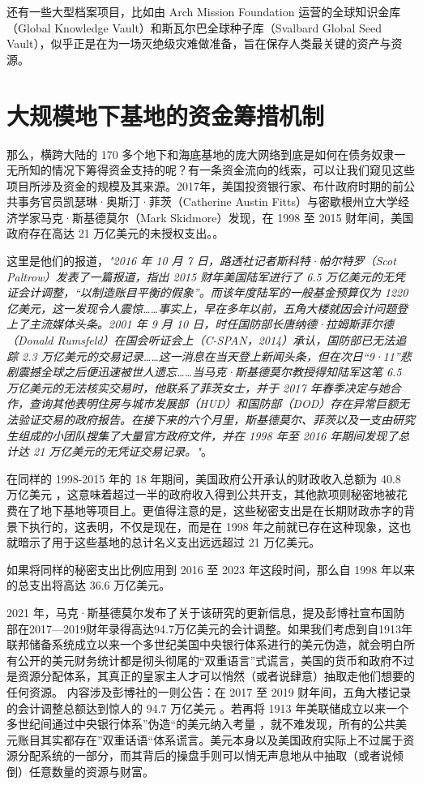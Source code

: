 \documentclass[10pt,twocolumn,letterpaper]{article}
\begin{document}
还有一些大型档案项目，比如由 Arch Mission Foundation 运营的全球知识金库（Global Knowledge Vault）\cite{29}和斯瓦尔巴全球种子库（Svalbard Global Seed Vault）\cite{30}，似乎正是在为一场灭绝级灾难做准备，旨在保存人类最关键的资产与资源。

\section{大规模地下基地的资金筹措机制}


那么，横跨大陆的 170 多个地下和海底基地的庞大网络到底是如何在债务奴隶一无所知的情况下筹得资金支持的呢？有一条资金流向的线索，可以让我们窥见这些项目所涉及资金的规模及其来源。2017年，美国投资银行家、布什政府时期的前公共事务官员凯瑟琳·奥斯汀·菲茨（Catherine Austin Fitts）与密歇根州立大学经济学家马克·斯基德莫尔（Mark Skidmore）发现，在 1998 至 2015 财年间，美国政府存在高达 21 万亿美元的未授权支出。\cite{11,12,13}。

这里是他们的报道，\textit{"2016 年 10 月 7 日，路透社记者斯科特·帕尔特罗（Scot Paltrow）发表了一篇报道，指出 2015 财年美国陆军进行了 6.5 万亿美元的无凭证会计调整，“以制造账目平衡的假象”。而该年度陆军的一般基金预算仅为 1220 亿美元，这一发现令人震惊……事实上，早在多年以前，五角大楼就因会计问题登上了主流媒体头条。2001 年 9 月 10 日，时任国防部长唐纳德·拉姆斯菲尔德（Donald Rumsfeld）在国会听证会上（C-SPAN，2014）承认，国防部已无法追踪 2.3 万亿美元的交易记录……这一消息在当天登上新闻头条，但在次日“9·11”悲剧震撼全球之后便迅速被世人遗忘……当马克·斯基德莫尔教授得知陆军这笔 6.5 万亿美元的无法核实交易时，他联系了菲茨女士，并于 2017 年春季决定与她合作，查询其他表明住房与城市发展部（HUD）和国防部（DOD）存在异常巨额无法验证交易的政府报告。在接下来的六个月里，斯基德莫尔、菲茨以及一支由研究生组成的小团队搜集了大量官方政府文件，并在 1998 年至 2016 年期间发现了总计达 21 万亿美元的无凭证交易记录。"}\cite{12}。

在同样的 1998-2015 年的 18 年期间，美国政府公开承认的财政收入总额为 40.8 万亿美元 \cite{15}，这意味着超过一半的政府收入得到公共开支，其他款项则秘密地被花费在了地下基地等项目上。更值得注意的是，这些秘密支出是在长期财政赤字的背景下执行的，这表明，不仅是现在，而是在 1998 年之前就已存在这种现象，这也就暗示了用于这些基地的总计名义支出远远超过 21 万亿美元。

如果将同样的秘密支出比例应用到 2016 至 2023 年这段时间，那么自 1998 年以来的总支出将高达 36.6 万亿美元。

2021 年，马克·斯基德莫尔发布了关于该研究的更新信息，提及彭博社宣布国防部在2017—2019财年录得高达94.7万亿美元的会计调整\cite{17,18}。如果我们考虑到自1913年联邦储备系统成立以来一个多世纪美国中央银行体系进行的美元伪造\cite{37}，就会明白所有公开的美元财务统计都是彻头彻尾的“双重语言”式谎言，美国的货币和政府不过是资源分配体系，其真正的皇家主人才可以悄然（或者说肆意）抽取走他们想要的任何资源。
内容涉及彭博社的一则公告：在 2017 至 2019 财年间，五角大楼记录的会计调整总额达到惊人的 94.7 万亿美元 \cite{17,18}。若再将 1913 年美联储成立以来一个多世纪间通过中央银行体系”伪造“的美元纳入考量 \cite{37}，就不难发现，所有的公共美元账目其实都存在”双重话语“体系谎言。美元本身以及美国政府实际上不过属于资源分配系统的一部分，而其背后的操盘手则可以悄无声息地从中抽取（或者说倾倒）任意数量的资源与财富。
\end{document}
